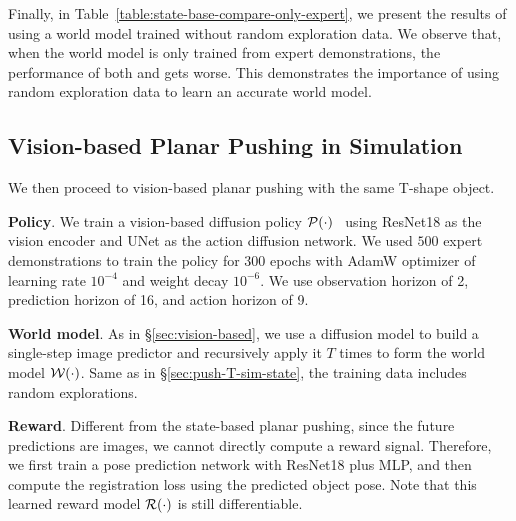 Finally, in Table~\ref{table:state-base-compare-only-expert}, we present the results of using a world model trained without random exploration data. We observe that, when the world model is only trained from expert demonstrations, the performance of both \gpcrank and \gpcopt gets worse. This demonstrates the importance of using random exploration data to learn an accurate world model.






\subsection{Vision-based Planar Pushing in Simulation}
\label{sec:push-T-sim-vision}



We then proceed to vision-based planar pushing with the same T-shape object.

\textbf{Policy}. We train a vision-based diffusion policy ${\cal P}(\cdot)$~\cite{chi2023diffusion} using ResNet18 as the vision encoder and UNet as the action diffusion network. We used $500$ expert demonstrations to train the policy for $300$ epochs with AdamW optimizer of learning rate $10^{-4}$ and weight decay $10^{-6}$. We use observation horizon of 2, prediction horizon of 16, and action horizon of 9. 


\textbf{World model}. As in \S\ref{sec:vision-based}, we use a diffusion model to build a single-step image predictor and recursively apply it $T$ times to form the world model ${\cal W}(\cdot)$. Same as in \S\ref{sec:push-T-sim-state}, the training data includes random explorations.

\textbf{Reward}. Different from the state-based planar pushing, since the future predictions are images, we cannot directly compute a reward signal. Therefore, we first train a pose prediction network with ResNet18 plus MLP, and then compute the registration loss using the predicted object pose. Note that this learned reward model ${\cal R}(\cdot)$ is still differentiable.


